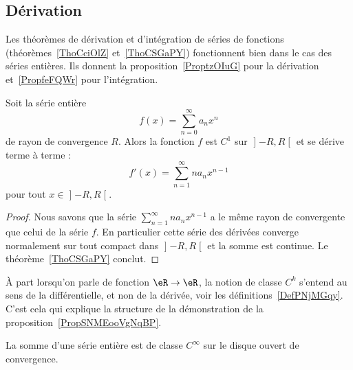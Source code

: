 \subsection{Dérivation}


Les théorèmes de dérivation et d'intégration de séries de fonctions (théorèmes~\ref{ThoCciOlZ} et~\ref{ThoCSGaPY}) fonctionnent bien dans le cas des séries entières. Ils donnent la proposition~\ref{ProptzOIuG} pour la dérivation et~\ref{PropfeFQWr} pour l'intégration.

\begin{proposition}     \label{ProptzOIuG}
	Soit la série entière
	\begin{equation}
		f(x)=\sum_{n=0}^{\infty}a_n x^n
	\end{equation}
	de rayon de convergence \( R\). Alors la fonction \( f\) est \( C^1\) sur \( \mathopen] -R , R \mathclose[\) et se dérive terme à terme :
		\begin{equation}
			f'(x)=\sum_{n=1}^{\infty}na_nx^{n-1}
		\end{equation}
		pour tout \( x\in\mathopen] -R , R \mathclose[\).
\end{proposition}

\begin{proof}
	Nous savons que la série \( \sum_{n=1}^{\infty}na_nx^{n-1}\) a le même rayon de convergente que celui de la série \( f\). En particulier cette série des dérivées converge normalement sur tout compact dans \( \mathopen] -R , R \mathclose[\) et la somme est continue. Le théorème~\ref{ThoCSGaPY} conclut.
\end{proof}

\begin{remark}
	À part lorsqu'on parle de fonction \( \eR\to \eR\), la notion de classe \( C^k\) s'entend au sens de la différentielle, et non de la dérivée, voir les définitions~\ref{DefPNjMGqy}. C'est cela qui explique la structure de la démonstration de la proposition~\ref{PropSNMEooVgNqBP}.
\end{remark}

\begin{corollary}       \label{CorCBYHooQhgara}
	La somme d'une série entière est de classe \( C^{\infty}\) sur le disque ouvert de convergence.
\end{corollary}

